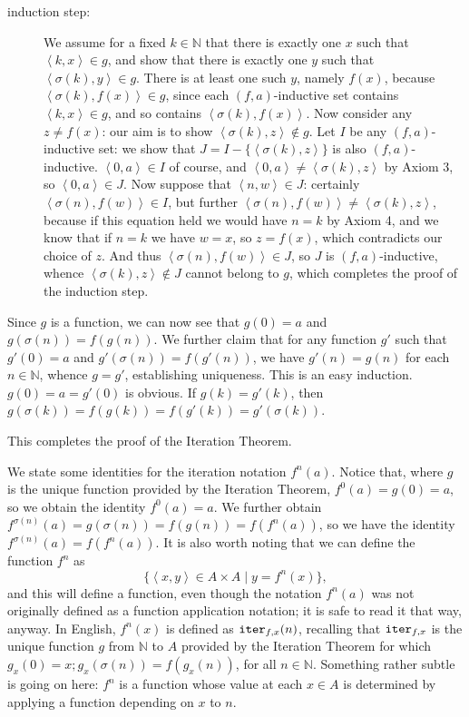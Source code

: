 \documentclass[12pt]{book}
\begin{document}
\begin{description}
\begin{description}
\item[induction step:]  We assume for a fixed $k \in \mathbb N$ that there is exactly one $x$ such that $\left<k,x\right>\in g$, and show that there is exactly one $y$ such that $\left<\sigma(k),y\right>\in g$.   There is at least one such $y$, namely $f(x)$, because $\left<\sigma(k),f(x)\right>\in g$, since each $(f,a)$-inductive set contains $\left<k,x\right>\in g$, and so contains $\left<\sigma(k),f(x)\right>$.  Now consider any $z \neq f(x)$:  our aim is to show $\left<\sigma(k),z\right> \not\in g$.  Let $I$
be any $(f,a)$-inductive set:  we show that $J=I - \{\left<\sigma(k),z\right>\}$ is also $(f,a)$-inductive.  $\left<0,a\right>\in I$ of course, and $\left<0,a\right>\neq \left<\sigma(k),z\right>$ by Axiom 3, so $\left<0,a\right>\in J$.  Now suppose that $\left<n,w\right>\in J$:  certainly $\left<\sigma(n),f(w)\right> \in I$, but further 
$\left<\sigma(n),f(w)\right>\neq \left<\sigma(k),z\right>$, because if this equation held we would have $n=k$ by Axiom 4, and we know that if $n=k$ we have $w=x$, so $z=f(x)$, which contradicts our choice of $z$.  And thus $\left<\sigma(n),f(w)\right>\in J$, so $J$ is $(f,a)$-inductive, whence $\left<\sigma(k),z\right> \not\in J$ cannot belong to $g$, which completes the proof of the induction step.

\end{description}

Since $g$ is a function, we can now see that $g(0)=a$ and $g(\sigma(n))=f(g(n))$.   We further claim that for any function $g'$ such that $g'(0)=a$ and $g'(\sigma(n))=f(g'(n))$,
we have $g'(n)=g(n)$ for each $n \in \mathbb N$, whence $g=g'$, establishing uniqueness.  This is an easy induction.  $g(0)=a=g'(0)$ is obvious.  If $g(k)=g'(k)$,
then $g(\sigma(k))=f(g(k))=f(g'(k))=g'(\sigma(k))$.

This completes the proof of the Iteration Theorem.

\end{description}

We state some identities for the iteration notation $f^n(a)$.  Notice that, where $g$ is the unique function provided by the Iteration Theorem, $f^0(a)=g(0)=a$, so we obtain the identity $f^0(a)=a$.   We further obtain $f^{\sigma(n)}(a) = g(\sigma(n))=f(g(n))=f(f^n(a))$, so we have the identity $f^{\sigma(n)}(a)=f(f^n(a))$.  It is also worth noting that we can define the function $f^n$ as $$\{\left<x,y\right>\in A \times A\mid y=f^n(x)\},$$ and this will define a function, even though the notation $f^n(a)$ was not originally defined as a function application notation;  it is safe to read it that way, anyway.  In English, $f^n(x)$ is defined as ${\tt iter}_{f,x}(n)$, recalling that ${\tt iter}_{f,x}$ is the unique function $g$ from $\mathbb N$ to $A$  provided by the Iteration Theorem for which $g_x(0)=x; g_x(\sigma(n))=f(g_x(n))$, for all $n \in \mathbb N$.  Something rather subtle is going on here:  $f^n$ is a function whose value at each $x\in A$ is determined by applying a function depending on $x$ to $n$.
\end{document}
